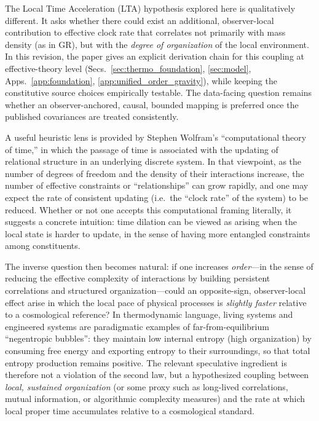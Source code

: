 \documentclass[10pt]{article}
\begin{document}
The Local Time Acceleration (LTA) hypothesis explored here is qualitatively different. It asks
whether there could exist an additional, observer-local contribution to effective clock rate that
correlates not primarily with mass density (as in GR), but with the \emph{degree of organization} of
the local environment. In this revision, the paper gives an explicit derivation chain for this
coupling at effective-theory level (Secs.~\ref{sec:thermo_foundation}, \ref{sec:model},
Apps.~\ref{app:foundation}, \ref{app:unified_order_gravity}), while keeping the constitutive source
choices empirically testable. The data-facing question remains whether an observer-anchored, causal,
bounded mapping is preferred once the published covariances are treated consistently.

A useful heuristic lens is provided by Stephen Wolfram's ``computational theory of time,'' in which
the passage of time is associated with the updating of relational structure in an underlying
discrete system. In that viewpoint, as the number of degrees of freedom and the density of their
interactions increase, the number of effective constraints or ``relationships'' can grow rapidly,
and one may expect the rate of consistent updating (i.e.\ the ``clock rate'' of the system) to be
reduced. Whether or not one accepts this computational framing literally, it suggests a concrete
intuition: time dilation can be viewed as arising when the local state is harder to update, in the
sense of having more entangled constraints among constituents.

The inverse question then becomes natural: if one increases \emph{order}---in the sense of reducing
the effective complexity of interactions by building persistent correlations and structured
organization---could an opposite-sign, observer-local effect arise in which the local pace of
physical processes is \emph{slightly faster} relative to a cosmological reference? In thermodynamic
language, living systems and engineered systems are paradigmatic examples of far-from-equilibrium
``negentropic bubbles'': they maintain low internal entropy (high organization) by consuming free
energy and exporting entropy to their surroundings, so that total entropy production remains
positive. The relevant speculative ingredient is therefore not a violation of the second law, but a
hypothesized coupling between \emph{local, sustained organization} (or some proxy such as long-lived
correlations, mutual information, or algorithmic complexity measures) and the rate at which local
proper time accumulates relative to a cosmological standard.
\end{document}
